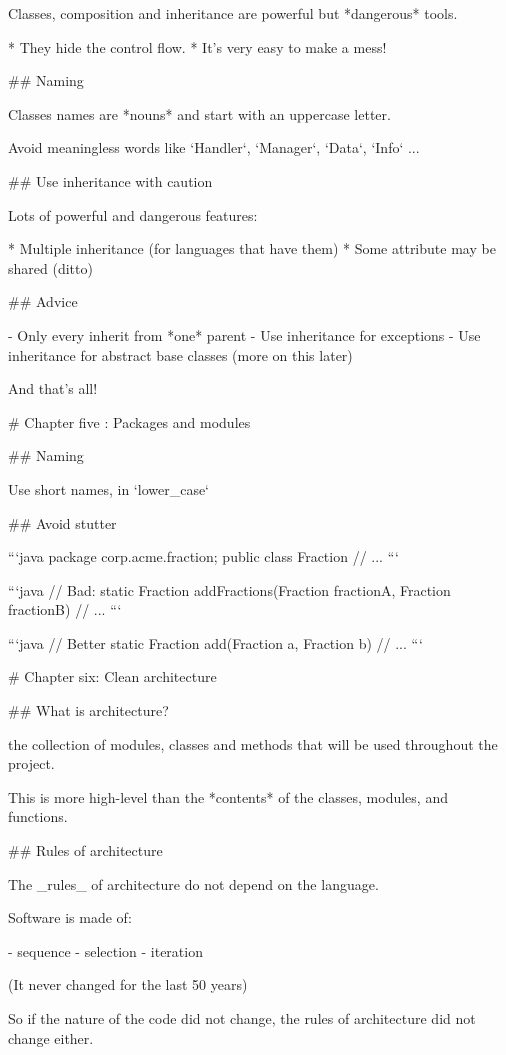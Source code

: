 Classes, composition and inheritance are powerful but *dangerous* tools.

* They hide the control flow.
* It's very easy to make a mess!

## Naming

Classes names are *nouns* and start with an uppercase letter.

Avoid meaningless words like `Handler`, `Manager`, `Data`, `Info` ...

## Use inheritance with caution

Lots of powerful and dangerous features:

* Multiple inheritance (for languages that have them)
* Some attribute may be shared (ditto)

##  Advice

- Only every inherit from *one* parent
- Use inheritance for exceptions
- Use inheritance for abstract base classes (more on this later)

And that's all!

# Chapter five : Packages and modules

## Naming

Use short names, in `lower_case`

## Avoid stutter

```java
package corp.acme.fraction;
public class Fraction {
  // ...
}
```

```java
// Bad:
static Fraction addFractions(Fraction fractionA, Fraction fractionB) {
    // ...
}
```

```java
// Better
static Fraction add(Fraction a, Fraction b) {
    // ...
}
```

# Chapter six: Clean architecture

## What is architecture?

the collection of modules, classes and methods that will
be used throughout the project.

This is more high-level than the *contents* of the classes, modules, and functions.

## Rules of architecture

The _rules_ of architecture do not depend on the language.

Software is made of:

- sequence
- selection
- iteration

(It never changed for the last 50 years)

So if the nature of the code did not change, the rules of architecture did
not change either.

